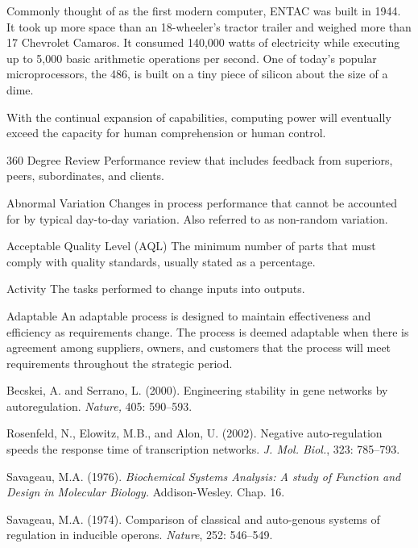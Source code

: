 \begin{VT1}


Commonly thought of as the first modern computer, ENTAC was built in 1944. It took up more space than an 18-wheeler's
tractor trailer and weighed more than 17 Chevrolet Camaros. It consumed 140,000 watts of electricity while executing
up to 5,000 basic arithmetic operations per second. One of today's popular microprocessors, the 486, is built on a
tiny piece of silicon about the size of a dime.

\VT
With the continual expansion of capabilities, computing power will eventually exceed the capacity for human
comprehension or human control.

\end{VT1}



\begin{Glossary}
\item[360 Degree Review] Performance review that includes feedback from superiors, peers, subordinates, and clients.
\item[Abnormal Variation] Changes in process performance that cannot be accounted for by typical day-to-day variation. Also referred to as
non-random variation.
\item[Acceptable Quality Level (AQL)] The minimum number of parts that must comply with quality standards, usually stated as a percentage.
\item[Activity] The tasks performed to change inputs into outputs.
\item[Adaptable] An adaptable process is designed to maintain effectiveness and efficiency as requirements change. The process is
deemed adaptable when there is agreement among suppliers, owners, and customers that the process will meet
requirements throughout the strategic period.
\end{Glossary}


\begin{thefurtherreading}{99}

\bibitem{} Becskei, A. and Serrano, L. (2000). Engineering stability in gene networks 
by autoregulation. \textit{Nature, }405: 590--593.

\bibitem{} Rosenfeld, N., Elowitz, M.B., and Alon, U. (2002). Negative auto-regulation 
speeds the response time of transcription networks. \textit{J. Mol. Biol.}, 323: 785--793.

\bibitem{} Savageau, M.A. (1976). \textit{Biochemical Systems Analysis: A study of Function and Design in Molecular Biology. }Addison-Wesley. Chap. 16.

\bibitem{} Savageau, M.A. (1974). Comparison of classical and auto-genous systems of 
regulation in inducible operons. \textit{Nature}, 252: 546--549.
\end{thefurtherreading}
